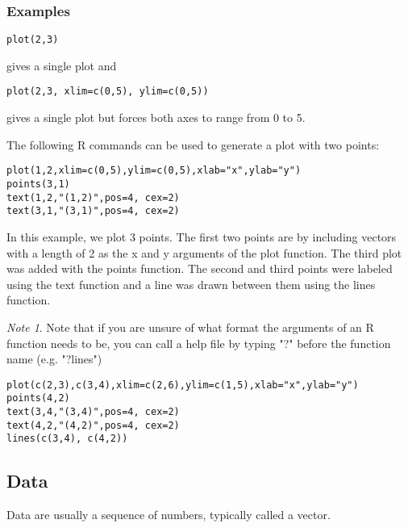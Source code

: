 \documentclass[12pt,a4paper]{article}
\theoremstyle{regla}
\theoremstyle{remark}
\newtheorem{notes}{Note}[section]
\theoremstyle{definition}
\theoremstyle{nonumberbreak}
\begin{document}
\subsubsection{Examples}
\begin{xmpl}

\begin{lstlisting}
plot(2,3)
\end{lstlisting}

gives a single plot and

\begin{lstlisting}
plot(2,3, xlim=c(0,5), ylim=c(0,5))
\end{lstlisting}

gives a single plot but forces both axes to range from 0 to 5.
\end{xmpl}
\begin{xmpl}
The following R commands can be used to generate a plot with two points:

\begin{lstlisting}
plot(1,2,xlim=c(0,5),ylim=c(0,5),xlab="x",ylab="y")
points(3,1)
text(1,2,"(1,2)",pos=4, cex=2)
text(3,1,"(3,1)",pos=4, cex=2)
\end{lstlisting}
\end{xmpl}
\begin{xmpl}


In this example, we plot 3 points. The first two
points are by including vectors with a length of 2 as the x and y
arguments of the plot function. The third plot was added with the
points function. The second and third points were labeled using the
text function and a line was drawn between them using the lines
function. \\
\begin{notes}
Note that if you are unsure of what format the arguments of
an R function needs to be, you can call a help file by typing "?"
before the function name (e.g. "?lines")
\end{notes}

\begin{lstlisting}
plot(c(2,3),c(3,4),xlim=c(2,6),ylim=c(1,5),xlab="x",ylab="y")
points(4,2)
text(3,4,"(3,4)",pos=4, cex=2)
text(4,2,"(4,2)",pos=4, cex=2)
lines(c(3,4), c(4,2))
\end{lstlisting}
\end{xmpl}


\subsection{Data}
\begin{fbox}
\begin{minipage}{0.97\textwidth}
Data are usually a sequence of numbers, typically called a vector.



\end{minipage}
\end{fbox}
\end{document}
